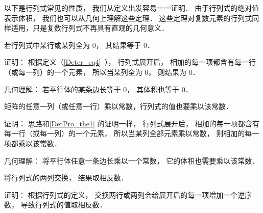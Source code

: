 

以下是行列式常见的性质， 我们从定义出发容易一一证明． 由于行列式的绝对值表示体积， 我们也可以从几何上理解这些定理． 这些定理对复数元素的行列式同样适用，只是复数行列式不再具有直观的几何意义．

\begin{theorem}{ } \label{DetPro_the1}
若行列式中某行或某列全为 0， 其结果等于 0．
\end{theorem}
证明： 根据定义（\autoref{Deter_eq4}~）， 行列式展开后， 相加的每一项都含有每一行（或每一列）的一个元素， 所以当某列全为 0， 则结果为 0．

几何理解： 若平行体的某条边长等于 0， 其体积也等于 0．

\begin{theorem}{ } \label{DetPro_the3}
矩阵的任意一列（或任意一行）乘以常数，行列式的值也要乘以该常数．
\end{theorem}
证明： 思路和\autoref{DetPro_the1} 的证明一样， 行列式展开后， 相加的每一项都含有每一行（或每一列）的一个元素， 所以当某列全部元素乘以常数， 则相加的每一项都乘以该常数．

几何理解： 将平行体任意一条边长乘以一个常数， 它的体积也需要乘以该常数．

\begin{theorem}{ }\label{DetPro_the6}
将行列式的两列交换， 结果取相反数．
\end{theorem}
证明： 根据行列式的定义， 交换两行或两列会给展开后的每一项增加一个逆序数， 导致行列式的值取相反数．

